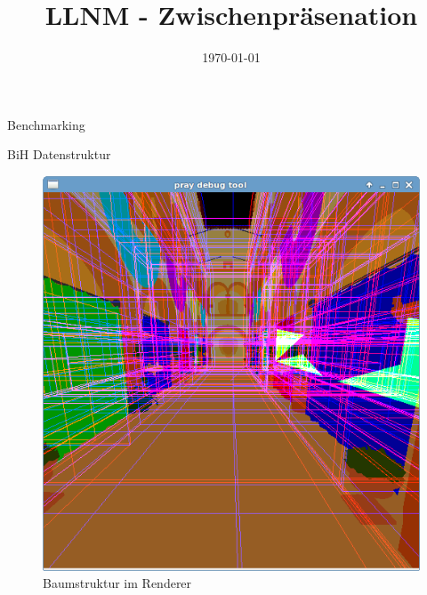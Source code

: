 


\title[LLNM]{LLNM - Zwischenpräsenation}
\subtitle{}
\date{\today}

	\begin{frame}
		\titlepage
	\end{frame}
	\begin{frame}{Benchmarking}
		
	\end{frame}
	\begin{frame}{BiH Datenstruktur}
		\begin{figure}[ht]
        \begin{minipage}[b]{0.45\linewidth}
            \centering
            \includegraphics[width=\textwidth]{images/bih1.png}
            \caption{Baumstruktur im Renderer}
            \label{fig:a}
        \end{minipage}
        \hspace{0.5cm}
        \begin{minipage}[b]{0.45\linewidth}
            \centering

\end{minipage}
\end{figure}
\end{frame}
